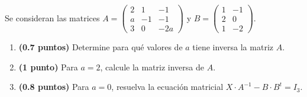 
Se consideran las matrices
$A=\begin{pmatrix}2&1&-1\\a&-1&-1\\3&0&-2a\end{pmatrix}$ y
$B=\begin{pmatrix}1&-1\\2&0\\1&-2\end{pmatrix}$.
\begin{enumerate}[label=\alph*)]
  \item \textbf{(0.7 puntos)} Determine para qué valores de $a$ tiene inversa
  la matriz $A$.
  \item \textbf{(1 punto)} Para $a=2$, calcule la matriz inversa de $A$.
  \item \textbf{(0.8 puntos)} Para $a=0$, resuelva la ecuación matricial
  $X\cdot A^{-1}-B\cdot B^t=I_3$.
\end{enumerate}
